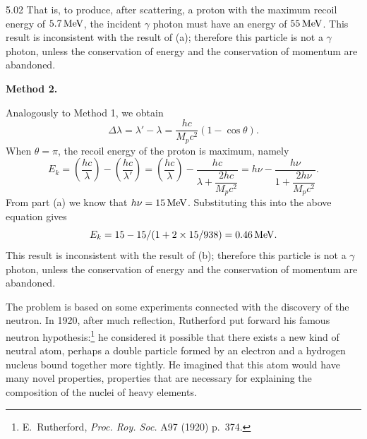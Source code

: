 \begin{solution}{5.02}
That is, to produce, after scattering, a proton with the maximum recoil energy of
$5.7\,\mathrm{MeV}$, the incident $\gamma$ photon must have an energy of $55\,\mathrm{MeV}$. This
result is inconsistent with the result of (a); therefore this particle is not a $\gamma$
photon, unless the conservation of energy and the conservation of momentum are abandoned.

\textbf{Method 2.}

Analogously to Method 1, we obtain
\begin{equation*}
\Delta\lambda = \lambda' - \lambda = \frac{hc}{M_pc^2}(1 - \cos\theta).
\end{equation*}
When $\theta = \pi$, the recoil energy of the proton is maximum, namely
\begin{equation*}
E_k = \left(\frac{hc}{\lambda}\right) - \left(\frac{hc}{\lambda'}\right)
    = \left(\frac{hc}{\lambda}\right)
      - \frac{hc}{\lambda + \dfrac{2hc}{M_pc^2}}
    = h\nu - \frac{h\nu}{1 + \dfrac{2h\nu}{M_pc^2}}.
\end{equation*}
From part (a) we know that $h\nu = 15\,\mathrm{MeV}$. Substituting this into the above equation
gives
\begin{equation*}
E_k = 15 - 15/(1 + 2\times 15/938) = 0.46\,\mathrm{MeV}.
\end{equation*}
This result is inconsistent with the result of (b); therefore this particle is not a $\gamma$
photon, unless the conservation of energy and the conservation of momentum are abandoned.

\begin{commentary}
The problem is based on some experiments connected with the discovery of the neutron. In 1920,
after much reflection, Rutherford put forward his famous neutron hypothesis:\footnote{E.~Rutherford,
\emph{Proc. Roy. Soc.} A97 (1920) p.~374.} he considered it possible that there exists a new
kind of neutral atom, perhaps a double particle formed by an electron and a hydrogen nucleus
bound together more tightly. He imagined that this atom would have many novel properties,
properties that are necessary for explaining the composition of the nuclei of heavy elements.


\end{commentary}
\end{solution}
